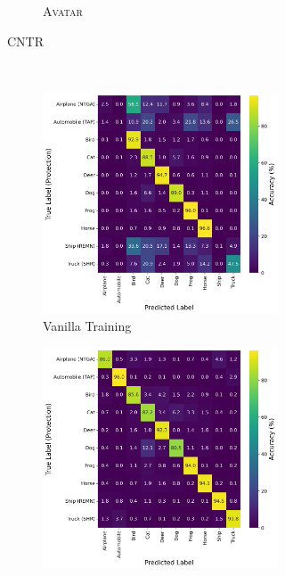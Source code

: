\documentclass[conference]{IEEEtran}
\theoremstyle{definition}
\theoremstyle{remark}
\theoremstyle{proposition}
\begin{document}
\begin{figure}[p!]
\begin{subfigure}{1.0\textwidth}
\begin{subfigure}{.40\textwidth}
            \caption*{\textsc{Avatar}}
    	\end{subfigure}
	\caption{CNTR}
    \vspace*{2em}
    \end{subfigure}
    \\
    \begin{subfigure}{1.0\textwidth}
    \centering
        \begin{subfigure}{.40\textwidth}
    		\centering
    		\includegraphics[width=1.0\textwidth]{combination_attacks/ResNet18_NTRS_t_0_confusion_matrix.png}
            \caption*{Vanilla Training}
    	\end{subfigure}
     \hspace{5em}
        \begin{subfigure}{.40\textwidth}
    		\centering
    		\includegraphics[width=1.0\textwidth]{combination_attacks/ResNet18_NTRS_t_200_confusion_matrix.png}

\end{subfigure}
\end{subfigure}
\end{figure}
\end{document}
